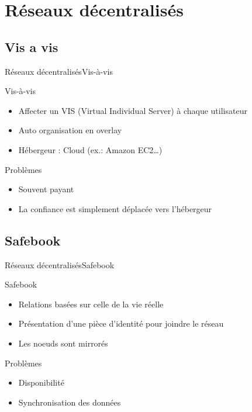 \section{Réseaux décentralisés}

\subsection{Vis a vis}

\begin{frame}{Réseaux décentralisés}{Vis-à-vis}
\begin{block}{Vis-à-vis}
\begin{itemize}
\item Affecter un VIS (Virtual Individual Server) à chaque utilisateur
\item Auto organisation en overlay
\item Hébergeur : Cloud (ex.: Amazon EC2\ldots)
\end{itemize}
\end{block}

\begin{block}{Problèmes}
\begin{itemize}
\item Souvent payant
\item La confiance est simplement déplacée vers l'hébergeur
\end{itemize}
\end{block}
\end{frame}

\subsection{Safebook}

\begin{frame}{Réseaux décentralisés}{Safebook}
\begin{block}{Safebook}
\begin{itemize}
\item Relations basées sur celle de la vie réelle
\item Présentation d'une pièce d'identité pour joindre le réseau
\item Les noeuds sont mirrorés
\end{itemize}
\end{block}

\begin{block}{Problèmes}
\begin{itemize}
\item Disponibilité
\item Synchronisation des données
\end{itemize}
\end{block}
\end{frame}

